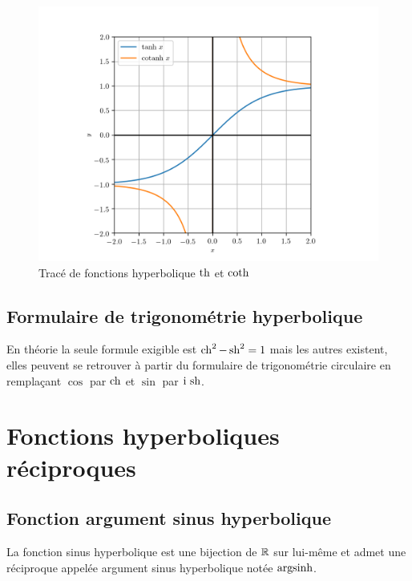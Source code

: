 \begin{figure}
  \centering
  \includegraphics[scale = 0.8]{tanh.png}
  \caption{Tracé de fonctions hyperbolique \(\operatorname{th}\) et 
  \(\operatorname{coth}\)}\label{fig:tracetanhcoth}
\end{figure}

\subsection{Formulaire de trigonométrie 
hyperbolique}\label{subsec:chap1-formulairetrigohyp}

En théorie la seule formule exigible est \(\operatorname{ch}^2-\operatorname{sh}^2 = 1\) mais les 
autres existent, elles peuvent se retrouver à partir du formulaire de 
trigonométrie circulaire en remplaçant \(\cos\) par \(\operatorname{ch}\) et \(\sin\) par 
\(\operatorname{i}{}\operatorname{sh}\).

\section{Fonctions hyperboliques réciproques}\label{sec:chap1-fonctionshyprec}

\subsection{Fonction argument sinus 
hyperbolique}\label{subsec:chap1-fonctionargsinh}

\begin{defdef}
  La fonction sinus hyperbolique est une bijection de \(\mathbb{R}\) sur lui-même et 
  admet une réciproque appelée argument sinus hyperbolique notée \(\operatorname{argsinh}\).
\end{defdef}

